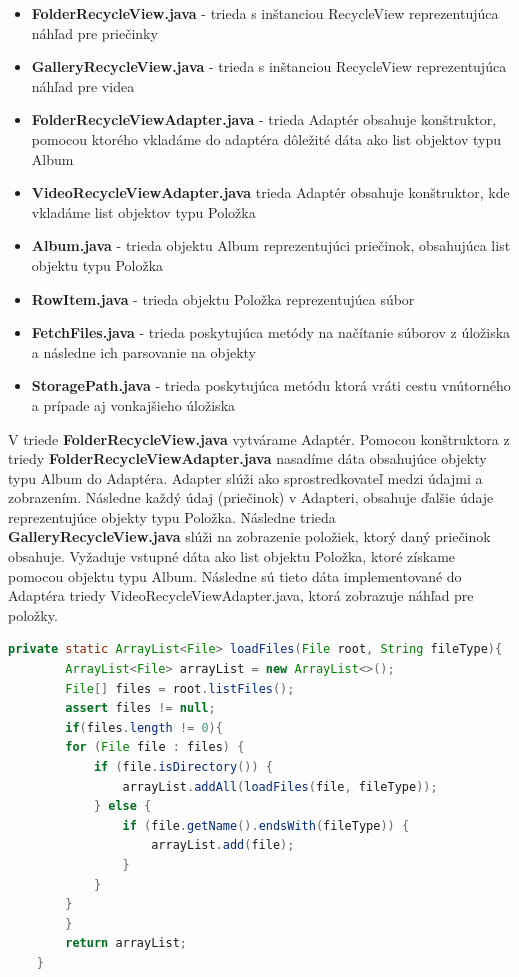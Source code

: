 \documentclass[12pt, oneside]{book}
\begin{document}
\begin{itemize}
    \item \textbf{FolderRecycleView.java} - trieda s inštanciou RecycleView reprezentujúca náhľad pre priečinky
    \item \textbf{GalleryRecycleView.java} - trieda s inštanciou RecycleView reprezentujúca náhľad pre videa
    \item \textbf{FolderRecycleViewAdapter.java} - trieda Adaptér obsahuje konštruktor, pomocou ktorého vkladáme do adaptéra dôležité dáta ako list objektov typu Album
    \item \textbf{VideoRecycleViewAdapter.java} trieda Adaptér obsahuje konštruktor, kde vkladáme list objektov typu Položka
    \item \textbf{Album.java} - trieda objektu Album reprezentujúci priečinok, obsahujúca list objektu typu Položka
    \item \textbf{RowItem.java} - trieda objektu Položka reprezentujúca súbor
    \item \textbf{FetchFiles.java} - trieda poskytujúca metódy na načítanie súborov z úložiska a následne ich parsovanie na objekty
    \item \textbf{StoragePath.java} - trieda poskytujúca metódu ktorá vráti cestu vnútorného a prípade aj vonkajšieho úložiska
\end{itemize}

V triede \textbf{FolderRecycleView.java} vytvárame Adaptér. Pomocou konštruktora z triedy \textbf{FolderRecycleViewAdapter.java} nasadíme dáta obsahujúce objekty typu Album do Adaptéra. Adapter slúži ako sprostredkovateľ medzi údajmi a zobrazením. Následne každý údaj (priečinok) v Adapteri, obsahuje ďalšie údaje reprezentujúce objekty typu Položka. Následne trieda \textbf{GalleryRecycleView.java} slúži na zobrazenie položiek, ktorý daný priečinok obsahuje. Vyžaduje vstupné dáta ako list objektu Položka, ktoré získame pomocou objektu typu Album. Následne sú tieto dáta implementované do Adaptéra triedy VideoRecycleViewAdapter.java, ktorá zobrazuje náhľad pre položky.

\begin{lstlisting}[language=Java, caption=Náhľad na rekurzívnu funkciu ktorá načitá všetky súbory podľa cesty a typu súboru.]
 private static ArrayList<File> loadFiles(File root, String fileType){
        ArrayList<File> arrayList = new ArrayList<>();
        File[] files = root.listFiles();
        assert files != null;
        if(files.length != 0){
        for (File file : files) {
            if (file.isDirectory()) {
                arrayList.addAll(loadFiles(file, fileType));
            } else {
                if (file.getName().endsWith(fileType)) {
                    arrayList.add(file);
                }
            }
        }
        }
        return arrayList;
    }
\end{lstlisting}
\end{document}
